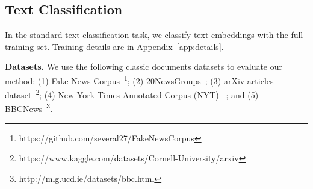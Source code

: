 \documentclass[11pt]{article}
\newcommand{\our}{\mbox{\textsc{DocSplit}}}
\newcommand{\ourbert}{$\our_{\mathrm{bert}}$}
\begin{document}
%
%
%


\subsection{Text Classification}
In the standard text classification task, we classify text embeddings with the full training set. 
Training details are in Appendix~\ref{app:details}.

\textbf{Datasets.}
We use the following classic documents datasets to evaluate our method:
(1) Fake News Corpus~\footnote{https://github.com/several27/FakeNewsCorpus};
(2) 20NewsGroups~\cite{Lang1995NewsWeederLT};
(3) arXiv articles dataset~\footnote{https://www.kaggle.com/datasets/Cornell-University/arxiv};
(4) New York Times Annotated Corpus (NYT) ~\cite{sandhaus2008new}; and
(5) BBCNews~\footnote{http://mlg.ucd.ie/datasets/bbc.html}.


\end{document}
